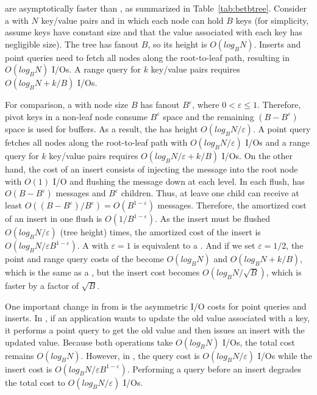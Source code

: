 \bets are asymptotically faster than \btrees, as summarized in
Table~\ref{tab:betbtree}.
Consider a \btree with $N$ key/value pairs and in which each node can hold
$B$ keys
(for simplicity, assume keys have constant size and that the value associated
with each key has negligible size).
The tree has fanout $B$, so its height is $O(log_{B}{N})$.
Inserts and point queries need to fetch all nodes along the root-to-leaf path,
resulting in $O(log_{B}{N})$ I/Os.
A range query for $k$ key/value pairs requires $O(log_{B}{N} + k/B)$ I/Os.

For comparison, a \bet with node size $B$ has fanout $B^{\varepsilon}$, where
$0 < \varepsilon \leq 1$.
Therefore, pivot keys in a non-leaf node consume $B^{\varepsilon}$ space and
the remaining $(B - B^{\varepsilon})$ space is used for buffers.
As a result, the \bet has height $O(log_{B}{N}/\varepsilon)$.
A point query fetches all nodes along the root-to-leaf path with
$O(log_{B}{N}/\varepsilon)$ I/Os and a range query for $k$ key/value pairs
requires $O({log_{B}{N}}/{\varepsilon} + k/B)$ I/Os.
On the other hand, the cost of an insert consists of injecting the message into
the root node with $O(1)$ I/O and flushing the message down at each level.
In each flush, \bets has $O(B - B^{\varepsilon})$ messages and $B^{\varepsilon}$
children.
Thus, at leave one child can receive at least
$O((B - B^{\varepsilon})/B^{\varepsilon}) = O(B^{1 - \varepsilon})$ messages.
Therefore, the amortized cost of an insert in one flush is
$O(1/B^{1 - \varepsilon})$.
As the insert must be flushed $O(log_{B}{N}/\varepsilon)$ (tree height) times,
the amortized cost of the insert is
$O({log_{B}{N}}/{\varepsilon B^{1 - \varepsilon}})$.
A \bet with $\varepsilon = 1$ is equivalent to a \btree.
And if we set $\varepsilon = 1/2$, the point and range query costs of the \bet
become $O(log_{B}{N})$ and $O(log_{B}{N} + k/B)$, which is the same as a \btree,
but the insert cost becomes $O(log_{B}{N}/{\sqrt{B}})$, which is faster by a
factor of $\sqrt{B}$.

One important change in \bets from \btrees is the asymmetric I/O costs for
point queries and inserts.
In \btrees, if an application wants to update the old value associated with a
key, it performs a point query to get the old value and then issues an insert
with the updated value.
Because both operations take $O(log_{B}{N})$ I/Os, the total cost remains
$O(log_{B}{N})$.
However, in \bets, the query cost is $O(log_{B}{N}/\varepsilon)$ I/Os while the
insert cost is $O({log_{B}{N}}/{\varepsilon B^{1 - \varepsilon}})$.
Performing a query before an insert degrades the total cost to
$O(log_{B}{N}/\varepsilon)$ I/Os.

